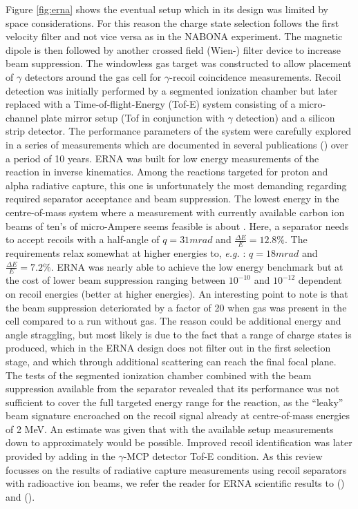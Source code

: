 Figure \ref{fig:erna} shows the eventual setup which in its design was limited by space considerations. For this reason the charge state selection follows the first velocity filter and not vice versa as in the NABONA experiment. The magnetic dipole is then followed by another crossed field (Wien-) filter device to increase beam suppression. The windowless gas target was constructed to allow placement of $\gamma$ detectors around the gas cell for $\gamma$-recoil coincidence measurements. Recoil detection was initially performed by a segmented ionization chamber but later replaced with a Time-of-flight-Energy (Tof-E) system consisting of a micro-channel plate mirror setup (Tof in conjunction with $\gamma$ detection) and a silicon strip detector. The performance parameters of the system were carefully explored in a series of measurements which are documented in several publications (\cite{roga99,roga03,gial04,schu04,dile08}) over a period of 10 years. ERNA was built for low energy measurements of the \reac{\alpha}{\gamma} reaction in inverse kinematics. Among the reactions targeted for proton and alpha radiative capture, this one is unfortunately the most demanding regarding required separator acceptance and beam suppression. The lowest energy in the centre-of-mass system where a measurement with currently available carbon ion beams of ten's of micro-Ampere seems feasible is about . Here, a separator needs to accept recoils with a half-angle of $q = 31 \unit{mrad}$ and $\frac{\Delta{}E}{E} = 12.8\%$. The requirements relax somewhat at higher energies to, {\it e.g.} : $q = 18 \unit{mrad}$ and $\frac{\Delta{}E}{E} = 7.2\%$. ERNA was nearly able to achieve the low energy benchmark but at the cost of lower beam suppression ranging between $10^{-10}$ and $10^{-12}$ dependent on recoil energies (better at higher energies). An interesting point to note is that the beam suppression deteriorated by a factor of 20 when gas was present in the cell compared to a run without gas. The reason could be additional energy and angle straggling, but most likely is due to the fact that a range of charge states is produced, which in the ERNA design does not filter out in the first selection stage, and which through additional scattering can reach the final focal plane. The tests of the segmented ionization chamber combined with the beam suppression available from the separator revealed that its performance was not sufficient to cover the full targeted energy range for the \reac{\alpha}{\gamma} reaction, as the ``leaky'' beam signature encroached on the  recoil signal already at centre-of-mass energies of 2 MeV. An estimate was given that with the available setup measurements down to approximately  would be possible. Improved recoil identification was later provided by adding in the $\gamma$-MCP detector Tof-E condition. As this review focusses on the results of radiative capture measurements using recoil separators with radioactive ion beams, we refer the reader for ERNA scientific results to \cite{schu05,schu05b} (\reac{\alpha}{\gamma}) and \cite{dile09} (\reac{\alpha}{\gamma}).
